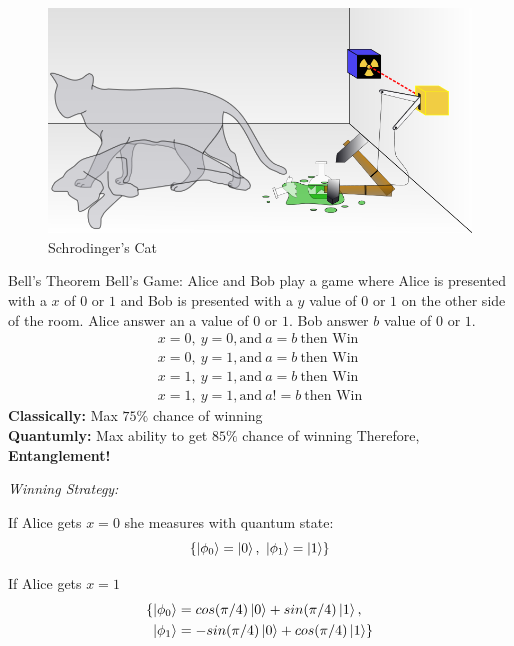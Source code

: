 \documentclass[final, 20pt]{beamer}
\newlength{\onecolwid}
\newlength{\twocolwid}
\begin{document}
\begin{frame}[t]
\begin{columns}[t]
\begin{column}{\twocolwid}
\begin{columns}[t,totalwidth=\twocolwid]
\begin{column}{\onecolwid}
\begin{figure}
\includegraphics[width=0.9\linewidth]{cat.png}
\caption{Schrodinger's Cat}
\end{figure}

\begin{block}{Bell's Theorem}
Bell's Game: Alice and Bob play a game where Alice is presented with a $x$ of $0$ or $1$ and Bob is presented with a $y$ value of $0$ or $1$ on the other side of the room. Alice answer an a value of $0$ or $1$. Bob answer $b$ value of $0$ or $1$.
\begin{align}
	x=0, \ y=0, \text{and} \ a=b \ \text{then Win} \\
	x=0, \ y=1, \text{and} \ a=b \ \text{then Win} \\
	x=1, \ y=1, \text{and} \ a=b \ \text{then Win} \\
	x=1, \ y=1, \text{and} \ a!=b \ \text{then Win}
\end{align}
\textbf{Classically:} Max $75\%$ chance of winning
\\
\textbf{Quantumly:} Max ability to get $85\%$ chance of winning
Therefore, \textbf{Entanglement!}

\emph{Winning Strategy:}

If Alice gets $x=0$ she measures with quantum state: 
\begin{equation}
	\lbrace\ket{\phi_0} = \ket{0}, \ \ket{\phi_1} = \ket{1}\rbrace
\end{equation}

If Alice gets $x=1$
\begin{align}
	\lbrace\ket{\phi_0} &= cos(\pi/4)\ket{0}
		+ sin(\pi/4)\ket{1},
	 \\ \ket{\phi_1} &= -sin(\pi/4)\ket{0}
		+ cos(\pi/4)\ket{1}\rbrace
\end{align}


\end{block}
\end{column}
\end{columns}
\end{column}
\end{columns}
\end{frame}
\end{document}
